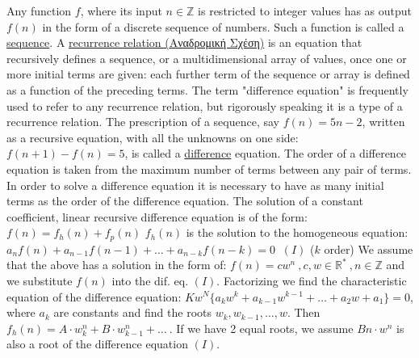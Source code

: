 \documentclass[12pt]{article}
\begin{document}
\begin{flushleft}
	\textbullet \quad Any function $f$, where its input $n \in \mathbb{Z}$ is restricted to integer values has as output $f(n)$ in the form of a discrete sequence of numbers. Such a function is called a \uline{sequence}. \linebreak 
    \textbullet \quad A \uline{recurrence relation (\textgreek{Αναδρομική Σχέση})} is an equation that recursively defines a sequence, or a multidimensional array of values, once one or more initial terms are given: each further term of the sequence or array is defined as a function of the preceding terms. \linebreak 
    \textbullet \quad The term "difference equation" is frequently used to refer to any recurrence relation, but rigorously speaking it is a type of a recurrence relation. \linebreak 
	\textbullet \quad The prescription of a sequence, say $f(n) = 5n -2$, written as a recursive equation, with all the unknowns on one side: $f(n+1) - f(n) = 5$, is called a \uline{difference} equation. \linebreak 
	\textbullet \quad The order of a difference equation is taken from the maximum number of terms between any pair of terms. In order to solve a difference equation it is necessary to have as many initial terms as the order of the difference equation. \linebreak 
	\textbullet \quad The solution of a constant coefficient, linear recursive difference equation is of the form: $f(n) = f_h(n) + f_p(n)$ \linebreak 
	\textbullet \quad $f_h(n)$ is the solution to the homogeneous equation: $\displaystyle a_n f(n) + a_{n-1} f(n-1) + \ldots + a_{n-k} f(n-k) = 0 \ $ {\tiny $(I)$} ($k$ order) \linebreak 
	We assume that the above has a solution in the form of: $f(n) = cw^n \ , c, w\in \mathbb{R}^* \ , n \in \mathbb{Z}$ and we substitute $f(n)$ into the dif. eq. $(I)$. \linebreak 
	Factorizing we find the characteristic equation of the difference equation: \linebreak 
	$\displaystyle Kw^N \big\{ a_k w^k + a_{k-1} w^{k-1} + \ldots + a_2 w +a_1 \big\} = 0$, where $a_k$ are constants and find the roots $w_k, w_{k-1}, \ldots , w$. \linebreak 
	Then $f_h(n) = A \cdot w_k^n + B\cdot w_{k-1}^n + \ldots\ $. \linebreak 
	If we have 2 equal roots, we assume $Bn \cdot w^n$ is also a root of the difference equation $(I)$. \linebreak 

\end{flushleft}
\end{document}

